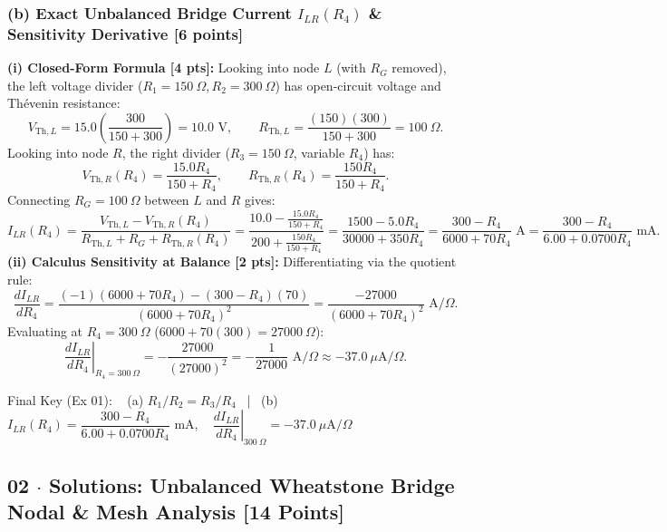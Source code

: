 \documentclass[10pt,letterpaper]{article}
\begin{document}
  \subsubsection*{(b) Exact Unbalanced Bridge Current $I_{LR}(R_4)$ \& Sensitivity Derivative [6 points]}
  \textbf{(i) Closed-Form Formula [4 pts]:} Looking into node $L$ (with $R_G$ removed), the left voltage divider ($R_1 = 150\ \Omega, R_2 = 300\ \Omega$) has open-circuit voltage and Th\'evenin resistance:
  $$V_{\text{Th},L} = 15.0\left(\frac{300}{150 + 300}\right) = 10.0\text{ V}, \qquad R_{\text{Th},L} = \frac{(150)(300)}{150 + 300} = 100\ \Omega.$$
  Looking into node $R$, the right divider ($R_3 = 150\ \Omega$, variable $R_4$) has:
  $$V_{\text{Th},R}(R_4) = \frac{15.0 R_4}{150 + R_4}, \qquad R_{\text{Th},R}(R_4) = \frac{150 R_4}{150 + R_4}.$$
  Connecting $R_G = 100\ \Omega$ between $L$ and $R$ gives:
  $$I_{LR}(R_4) = \frac{V_{\text{Th},L} - V_{\text{Th},R}(R_4)}{R_{\text{Th},L} + R_G + R_{\text{Th},R}(R_4)} = \frac{10.0 - \frac{15.0 R_4}{150 + R_4}}{200 + \frac{150 R_4}{150 + R_4}} = \frac{1500 - 5.0 R_4}{30000 + 350 R_4} = \frac{300 - R_4}{6000 + 70 R_4}\text{ A} = \frac{300 - R_4}{6.00 + 0.0700 R_4}\text{ mA}.$$
  \textbf{(ii) Calculus Sensitivity at Balance [2 pts]:} Differentiating via the quotient rule:
  $$\frac{dI_{LR}}{dR_4} = \frac{(-1)(6000 + 70 R_4) - (300 - R_4)(70)}{(6000 + 70 R_4)^2} = \frac{-27000}{(6000 + 70 R_4)^2}\text{ A}/\Omega.$$
  Evaluating at $R_4 = 300\ \Omega$ ($6000 + 70(300) = 27000\ \Omega$):
  $$\left.\frac{dI_{LR}}{dR_4}\right|_{R_4 = 300\ \Omega} = -\frac{27000}{(27000)^2} = -\frac{1}{27000}\text{ A}/\Omega \approx -37.0\ \mu\text{A}/\Omega.$$

Final Key (Ex 01): ~ (a) $R_1/R_2 = R_3/R_4$ ~|~ (b) $I_{LR}(R_4) = \dfrac{300 - R_4}{6.00 + 0.0700 R_4}\text{ mA}$, ~ $\left.\dfrac{dI_{LR}}{dR_4}\right|_{300\ \Omega} = -37.0\ \mu\text{A}/\Omega$


\newpage



\subsection*{02 $\cdot$ Solutions: Unbalanced Wheatstone Bridge Nodal \& Mesh Analysis \hfill [14 Points]}
\end{document}
